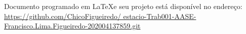 
%
\begin{anexosenv}

\partanexos

Documento programado em \LaTeX  e seu projeto está disponível no endereço: \\ \href{https://github.com/ChicoFigueiredo/estacio-Trab001-AASE-Francisco.Lima.Figueiredo-202004137859.git}{https://github.com/ChicoFigueiredo/ estacio-Trab001-AASE-Francisco.Lima.Figueiredo-202004137859.git}\\


\end{anexosenv}

